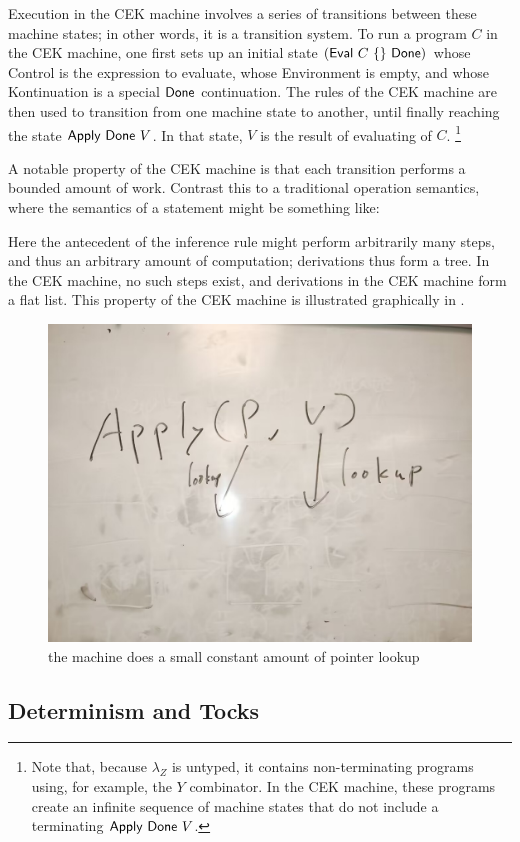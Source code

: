 Execution in the CEK machine involves a series of transitions between
these machine states; in other words, it is a transition system. To
run a program $C$ in the CEK machine, one first sets up an initial
state $(\Eval~C~\{\}~\Done)$ whose Control is the expression to
evaluate, whose Environment is empty, and whose Kontinuation is a
special $\Done$ continuation. The rules of the CEK machine are then
used to transition from one machine state to another, until finally
reaching the state $\Apply~\Done~V$. In that state, $V$ is the result
of evaluating of $C$.%
\footnote{Note that, because $\lambda_Z$ is untyped, it contains
non-terminating programs using, for example, the $Y$ combinator. In
the CEK machine, these programs create an infinite sequence of machine
states that do not include a terminating $\Apply~\Done~V$.}

A notable property of the CEK machine is that each transition performs
a bounded amount of work. Contrast this to a traditional operation
semantics, where the semantics of a \sCase statement might be something
like:

\begin{mathpar}
\end{mathpar}

Here the antecedent of the inference rule might perform arbitrarily
many steps, and thus an arbitrary amount of computation; derivations
thus form a tree. In the CEK machine, no such steps exist, and
derivations in the CEK machine form a flat list. This property of the
CEK machine is illustrated graphically in .

\begin{figure}
\includegraphics[width=0.5\columnwidth]{1}
\caption{the machine does a small constant amount of pointer lookup}
\label{fig:constant}
\end{figure}

\subsection{Determinism and Tocks}

